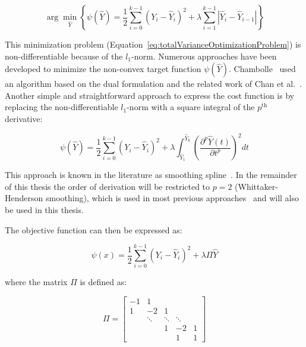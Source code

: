 \begin{equation}
	\arg\min_{\hat{Y}} \left\{ \psi(\hat{Y}) = \frac{1}{2}\sum_{i=0}^{k-1}{(Y_{i}-\hat{Y}_{i})^2+\lambda \sum_{i=1}^{k-1}{|\hat{Y}_{i}-\hat{Y}_{i-1}|}} \right\}
\label{eq:totalVarianceOptimizationProblem}
\end{equation}

This minimization problem (Equation~\ref{eq:totalVarianceOptimizationProblem}) is non-differentiable because of the $l_{1}$-norm. Numerous approaches have been developed to minimize the non-convex target function $\psi(\hat{Y})$. Chambolle~\cite{Chambolle1997,Chambolle2004,Chambolle2005} used an algorithm based on the dual formulation and the related work of Chan et al.~\cite{Chan2001,Chan2005,Chan2006}. Another simple and straightforward approach to express the cost function is by replacing the non-differentiable $l_{1}$-norm with a square integral of the $p^{\text{th}}$ derivative: %
 
\begin{equation}
	\psi(\hat{Y}) = \frac{1}{2}\sum_{i=0}^{k-1}{(Y_{i}-\hat{Y}_{i})^2}+\lambda \int_{\hat{Y}_{1}}^{\hat{Y}_{k}}{\left(\frac{\partial^{p}\hat{Y}(t)}{\partial t^{p}}\right)^{2}dt}
\label{eq:smoothingSpline}
\end{equation}

This approach is known in the literature as smoothing spline~\cite{Takezawa2005, Wahba1990, Schoenberg1964}. In the remainder of this thesis the order of derivation will be restricted to $p=2$ (Whittaker-Henderson smoothing), which is used in most previous approaches~\cite{Whittaker1922, Spoerl1937, Spoerl1941, Joseph1952, Eilers2003} and will also be used in this thesis.

The objective function can then be expressed as:

\begin{equation}
	\psi(x) = \frac{1}{2}\sum_{i=0}^{k-1}{(Y_{i}-\hat{Y}_{i})^2}+\lambda \Pi \hat{Y}
	\label{eq:whittakerHendersonSmoothing}
\end{equation}

where the matrix $\Pi$ is defined as:

\begin{equation}
	\Pi = 
	\begin{bmatrix}
		-1 & 1 & & &\\
		1 & -2 & 1 & & \\
		& \ddots & \ddots & \ddots & \\
		& & 1 & -2 & 1 \\
		& & & 1 & 1
	\end{bmatrix}
\label{eq:}
\end{equation}

